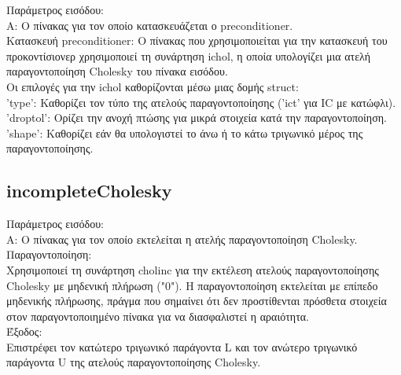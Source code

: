 \documentclass[12pt,a4paper]{article}
\begin{document}
Παράμετρος εισόδου:\\
A: Ο πίνακας για τον οποίο κατασκευάζεται ο preconditioner.\\
Κατασκευή preconditioner: Ο πίνακας που χρησιμοποιείται για την κατασκευή του προκοντίσιονερ χρησιμοποιεί τη συνάρτηση ichol, η οποία υπολογίζει μια ατελή παραγοντοποίηση Cholesky του πίνακα εισόδου.\\

Οι επιλογές για την ichol καθορίζονται μέσω μιας δομής struct:\\
'type': Καθορίζει τον τύπο της ατελούς παραγοντοποίησης ('ict' για IC με κατώφλι).\\
'droptol': Ορίζει την ανοχή πτώσης για μικρά στοιχεία κατά την παραγοντοποίηση.\\
'shape': Καθορίζει εάν θα υπολογιστεί το άνω ή το κάτω τριγωνικό μέρος της παραγοντοποίησης.\\

\subsection{incompleteCholesky}
Παράμετρος εισόδου:\\
A: Ο πίνακας για τον οποίο εκτελείται η ατελής παραγοντοποίηση Cholesky.\\

Παραγοντοποίηση:\\
Χρησιμοποιεί τη συνάρτηση cholinc για την εκτέλεση ατελούς παραγοντοποίησης Cholesky με μηδενική πλήρωση ("0").
Η παραγοντοποίηση εκτελείται με επίπεδο μηδενικής πλήρωσης, πράγμα που σημαίνει ότι δεν προστίθενται πρόσθετα στοιχεία στον παραγοντοποιημένο πίνακα για να διασφαλιστεί η αραιότητα.\\

Έξοδος:\\
Επιστρέφει τον κατώτερο τριγωνικό παράγοντα L και τον ανώτερο τριγωνικό παράγοντα U της ατελούς παραγοντοποίησης Cholesky.
\end{document}
